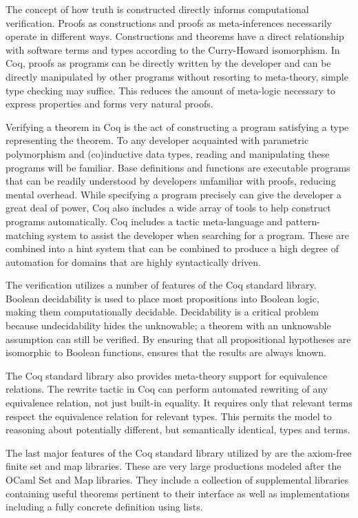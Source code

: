 The concept of how truth is constructed directly informs computational verification.
Proofs as constructions and proofs as meta-inferences necessarily operate in different ways.
Constructions and theorems have a direct relationship with software terms and types according to the Curry-Howard isomorphism. 
In Coq, proofs as programs can be directly written by the developer and can be directly manipulated by other programs without resorting to meta-theory, simple type checking may suffice.
This reduces the amount of meta-logic necessary to express properties and forms very natural proofs.

Verifying a theorem in Coq is the act of constructing a program satisfying a type representing the theorem.
To any developer acquainted with parametric polymorphism and (co)inductive data types, reading and manipulating these programs will be familiar.
Base definitions and functions are executable programs that can be readily understood by developers unfamiliar with proofs, reducing mental overhead.
While specifying a program precisely can give the developer a great deal of power, Coq also includes a wide array of tools to help construct programs automatically.
Coq includes a tactic meta-language and pattern-matching system to assist the developer when searching for a program.
These are combined into a hint system that can be combined to produce a high degree of automation for domains that are highly syntactically driven.

The \TMmodelName{} verification utilizes a number of features of the Coq standard library.
Boolean decidability is used to place most propositions into Boolean logic, making them computationally decidable.
Decidability is a critical problem because undecidability hides the unknowable; a theorem with an unknowable assumption can still be verified.
By ensuring that all propositional hypotheses are isomorphic to Boolean functions, \TMmodelName{} ensures that the results are always known.

The Coq standard library also provides meta-theory support for equivalence relations.
The rewrite tactic in Coq can perform automated rewriting of any equivalence relation, not just built-in equality.
It requires only that relevant terms respect the equivalence relation for relevant types.
This permits the model to reasoning about potentially different, but semantically identical, types and terms.

The last major features of the Coq standard library utilized by \TMmodelName{} are the axiom-free finite set and map libraries. \cite{CoqFSet}
These are very large productions modeled after the OCaml Set and Map libraries.
They include a collection of supplemental libraries containing useful theorems pertinent to their interface as well as implementations including a fully concrete definition using lists.

